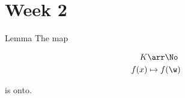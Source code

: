 \section{Week 2}

Lemma The map

\begin{align*}
	K &\arr \No \\
	f(x) &\mapsto f(\w)
\end{align*}

is onto.

